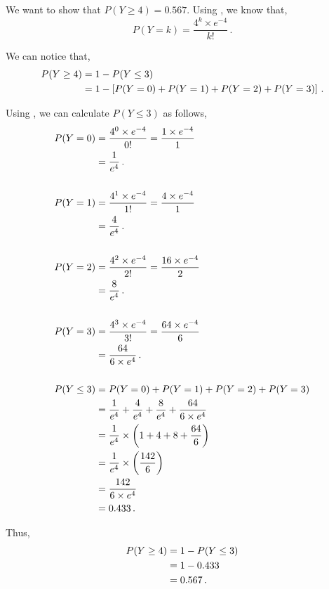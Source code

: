 \begin{subquestions}
\begin{subsubquestions}
We want to show that $P(Y \geq 4) = 0.567$. Using , we know that,
\begin{equation}
	P(Y=k)= \frac{4^k \times e^{-4}}{k!} \,. \label{2013:q4:eq:Pois1}
\end{equation}

We can notice that,
\begin{align}
	P(Y \geq 4) & = 1 - P(Y \leq 3) \nonumber \\
	            & = 1 - \left[P(Y=0)+P(Y=1)+P(Y=2)+P(Y=3) \right] \,.
\end{align}

Using , we can calculate $P(Y \leq 3)$ as follows,
\begin{align}
	P(Y=0) & = \frac{4^0 \times e^{-4}}{0!} 
	         = \frac{1 \times e^{-4}}{1} \nonumber \\
	       & = \frac{1}{e^4} \,. \\	\nonumber \\
	P(Y=1) & = \frac{4^1 \times e^{-4}}{1!} 
	         = \frac{4 \times e^{-4}}{1} \nonumber \\
	       & = \frac{4}{e^4} \,. \\	\nonumber \\       
	P(Y=2) & = \frac{4^2 \times e^{-4}}{2!} 
		     = \frac{16 \times e^{-4}}{2} \nonumber \\
           & = \frac{8}{e^4} \,. \\ \nonumber \\            
	P(Y=3) & = \frac{4^3 \times e^{-4}}{3!} 
             = \frac{64 \times e^{-4}}{6} \nonumber \\
           & = \frac{64}{6 \times e^4} \,. \\ \nonumber \\         
    P(Y \leq 3) & = P(Y=0)+P(Y=1)+P(Y=2)+P(Y=3) \nonumber \\
                & = \frac{1}{e^4} + \frac{4}{e^4} + \frac{8}{e^4} + \frac{64}{6 \times e^4} \nonumber \\
                & = \frac{1}{e^4} \times \left(1+4+8+\frac{64}{6} \right) \nonumber \\
                & = \frac{1}{e^4} \times \left(\frac{142}{6} \right) \nonumber \\
                & = \frac{142}{6 \times e^4} \nonumber \\
                & = 0.433 \,.
\end{align}

Thus,
\begin{align}
	P(Y \geq 4) & = 1 - P(Y \leq 3) \nonumber \\
	            & = 1 - 0.433 \nonumber \\
	            & = 0.567 \,.
\end{align}


\end{subsubquestions}
\end{subquestions}
